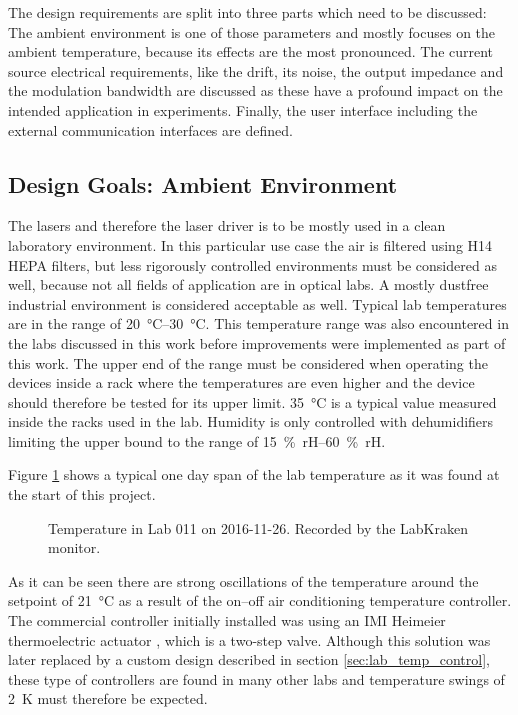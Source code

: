 The design requirements are split into three parts which need to be discussed: The ambient environment is one of those parameters and mostly focuses on the ambient temperature, because its effects are the most pronounced. The current source electrical requirements, like the drift, its noise, the output impedance and the modulation bandwidth are discussed as these have a profound impact on the intended application in experiments. Finally, the user interface including the external communication interfaces are defined.

\subsection{Design Goals: Ambient Environment}%
\label{sec:design_goal_environment}
The lasers and therefore the laser driver is to be mostly used in a clean laboratory environment. In this particular use case the air is filtered using H14 HEPA filters, but less rigorously controlled environments must be considered as well, because not all fields of application are in optical labs. A mostly dustfree industrial environment is considered acceptable as well. Typical lab temperatures are in the range of \qtyrange[range-phrase=\textup{~to~}]{20}{30}{\celsius}. This temperature range was also encountered in the labs discussed in this work before improvements were implemented as part of this work. The upper end of the range must be considered when operating the devices inside a rack where the temperatures are even higher and the device should therefore be tested for its upper limit. \qty{35}{\celsius} is a typical value measured inside the racks used in the lab. Humidity is only controlled with dehumidifiers limiting the upper bound to the range of \qtyrange[range-phrase=\textup{~to~}]{15}{60}{\percent rH}.

Figure \ref{fig:lab_temperature_start_of_project} shows a typical one day span of the lab temperature as it was found at the start of this project.
\begin{figure}[ht]
    \centering
    
    \caption{Temperature in Lab 011 on 2016-11-26. Recorded by the LabKraken monitor.}
    \label{fig:lab_temperature_start_of_project}
\end{figure}

As it can be seen there are strong oscillations of the temperature around the setpoint of \qty{21}{\celsius} as a result of the on–off air conditioning temperature controller. The commercial controller initially installed was using an IMI Heimeier  thermoelectric actuator \cite{datasheet_heimeier_emo_t}, which is a two-step valve. Although this solution was later replaced by a custom design described in section \ref{sec:lab_temp_control}, these type of controllers are found in many other labs and temperature swings of \qty{2}{\kelvin} must therefore be expected.

